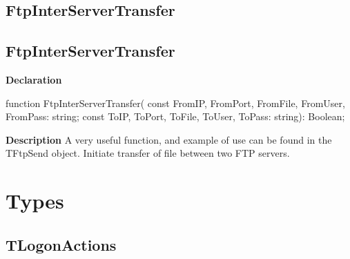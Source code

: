 \documentclass{report}
\newif\ifpdf
\begin{document}
\subsection*{\large{\textbf{FtpInterServerTransfer}}\normalsize\hspace{1ex}\hrulefill}
\else
\subsection*{FtpInterServerTransfer}
\fi
\label{ftpsend-FtpInterServerTransfer}
\begin{list}{}{
\setlength{\itemindent}{0cm}
\setlength{\listparindent}{0cm}
\setlength{\leftmargin}{\evensidemargin}
\addtolength{\leftmargin}{\tmplength}
\settowidth{\labelsep}{X}
\addtolength{\leftmargin}{\labelsep}
\setlength{\labelwidth}{\tmplength}
}
\item[\textbf{Declaration}\hfill]
\ifpdf
\begin{flushleft}
\fi
\begin{ttfamily}
function FtpInterServerTransfer( const FromIP, FromPort, FromFile, FromUser, FromPass: string; const ToIP, ToPort, ToFile, ToUser, ToPass: string): Boolean;\end{ttfamily}

\ifpdf
\end{flushleft}
\fi

\par
\item[\textbf{Description}]
A very useful function, and example of use can be found in the TFtpSend object. Initiate transfer of file between two FTP servers.

\end{list}
\section{Types}
\ifpdf
\subsection*{\large{\textbf{TLogonActions}}\normalsize\hspace{1ex}\hrulefill}
\else
\end{document}
